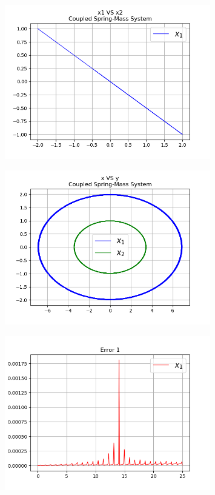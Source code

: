 \documentclass{article}
\begin{document}
\begin{figure}[!ht]
\centering
\includegraphics[width=0.8\textwidth]{two_springs2-2.png}
\end{figure}
\begin{figure}[!ht]
\centering
\includegraphics[width=0.8\textwidth]{two_springs2-3.png}
\end{figure}
\begin{figure}[!ht]
\centering
\includegraphics[width=0.8\textwidth]{two_springs2-E1}
\end{figure}
\end{document}
